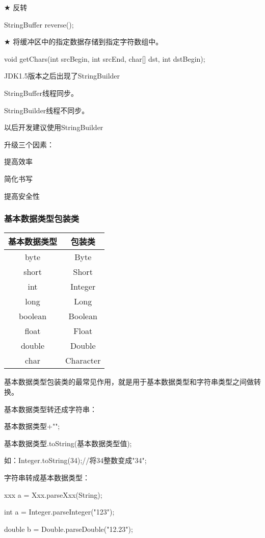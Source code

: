 \documentclass[UTF8]{ctexart}
\begin{document}
$\bigstar$ 反转

\qquad StringBuffer reverse();

$\bigstar$ 将缓冲区中的指定数据存储到指定字符数组中。

\qquad void getChars(int srcBegin, int srcEnd, char[] dst, int dstBegin);

JDK1.5版本之后出现了StringBuilder

StringBuffer线程同步。

StringBuilder线程不同步。

以后开发建议使用StringBuilder

升级三个因素：

\textbullet 提高效率

\textbullet 简化书写

\textbullet 提高安全性



\subsubsection{基本数据类型包装类}

\begin{tabular}{c|c}
基本数据类型 &包装类\\\hline
byte &Byte \\
short &Short \\
int   &Integer \\
long  &Long \\
boolean &Boolean \\
float &Float \\
double &Double \\
char   &Character 
\end{tabular}

基本数据类型包装类的最常见作用，就是用于基本数据类型和字符串类型之间做转换。

基本数据类型转还成字符串：

\textbullet 基本数据类型+"";

\textbullet 基本数据类型.toString(基本数据类型值);

\qquad 如：Integer.toString(34);//将34整数变成"34";

字符串转成基本数据类型：

\textbullet xxx a = Xxx.parseXxx(String);

\qquad int a = Integer.parseInteger("123");

\qquad double b = Double.parseDouble("12.23");
\end{document}
